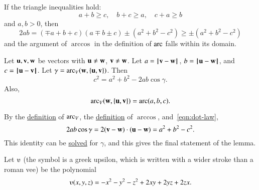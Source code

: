 If the triangle inequalities hold:
\begin{displaymath}
a + b \ge c,\quad b + c \ge a, \quad c+a \ge b
\end{displaymath}
and $a,b >0$, then
\begin{displaymath}
2 a b = (\mp a+b+c)(a \mp b \pm c) \pm (a^2 + b^2 - c^2) \ge \pm  (a^2 + b^2 - c^2)
\end{displaymath}
and the argument of $\arccos$ in the definition of $\operatorname{arc}$  falls within its domain.

\begin{lemma}\label{lemma:loc}
Let ${\mathbf u},{\mathbf v},{\mathbf w}$ be vectors with ${\mathbf u}\ne {\mathbf w}$, ${\mathbf v}\ne {\mathbf w}$.  Let $a
    = {\hskip0.1em|\hskip-0.15em|\hskip0.1em}{\mathbf v}  -  {\mathbf w}{\hskip0.1em|\hskip-0.15em|\hskip0.1em}$, $b = {\hskip0.1em|\hskip-0.15em|\hskip0.1em}{\mathbf u}  -  {\mathbf w}{\hskip0.1em|\hskip-0.15em|\hskip0.1em}$, and $c = {\hskip0.1em|\hskip-0.15em|\hskip0.1em}{\mathbf u}  -  {\mathbf v}{\hskip0.1em|\hskip-0.15em|\hskip0.1em}$.
    Let $\gamma=\operatorname{arc}_V({\mathbf w},\{{\mathbf u},{\mathbf v}\})$.    Then
        \begin{displaymath}c^2 = a^2 + b^2 - 2 a b \cos\gamma.\end{displaymath}
Also,
\begin{displaymath}
\operatorname{arc}_V({\mathbf w},\{{\mathbf u},{\mathbf v}\})= \operatorname{arc}(a,b,c).
\end{displaymath}

\end{lemma}
%
%
%
%
\begin{proved}
By the \hyperref[def:angle]{definition} of $\operatorname{arc}_V$, the
\hyperref[def:arccos]{definition} of $\arccos$, and~\eqref{eqn:dot-law},
\begin{displaymath}
2 a b \cos \gamma = 2 ({\mathbf v} - {\mathbf w})\cdot ({\mathbf u} - {\mathbf w}) = a^2 + b^2 - c^2.
\end{displaymath}
This identity can be \hyperref[def:arccos]{solved} for $\gamma$, and this gives the final statement of the lemma.
\swallowed\end{proved}


\begin{definition}[$\ups$]\label{def:ups}
Let $\ups$ (the symbol is a greek upsilon, which is written with a
wider stroke than a roman vee) be the polynomial
    \begin{displaymath}\ups(x,y,z) = -x^2 - y^2 - z^2 + 2 x y + 2 y z + 2 z x.\end{displaymath}
%
\end{definition}



